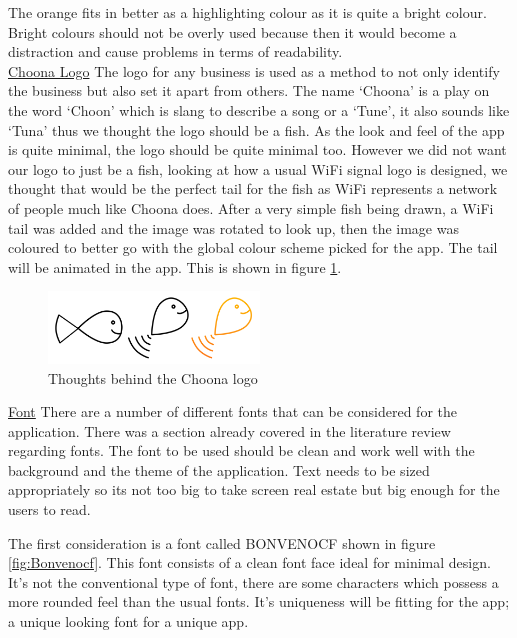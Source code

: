 The orange fits in better as a highlighting colour as it is quite a bright colour. Bright colours should not be overly used because then it would become a distraction and cause problems in terms of readability.  \\

\noindent\underline{Choona Logo}\newline
The logo for any business is used as a method to not only identify the business but also set it apart from others. The name `Choona' is a play on the word `Choon' which is slang to describe a song or a `Tune', it also sounds like `Tuna' thus we thought the logo should be a fish. As the look and feel of the app is quite minimal, the logo should be quite minimal too. However we did not want our logo to just be a fish, looking at how a usual WiFi signal logo is designed, we thought that would be the perfect tail for the fish as WiFi represents a network of people much like Choona does. After a very simple fish being drawn, a WiFi tail was added and the image was rotated to look up, then the image was coloured to better go with the global colour scheme picked for the app. The tail will be animated in the app. This is shown in figure \ref{fig:logo}.

\begin{figure}[h!]
\centering
\includegraphics[width=0.5\textwidth]{./img/logothinking.png}
\caption{Thoughts behind the Choona logo}
\label{fig:logo}
\end{figure}


\noindent\underline{Font}\newline
There are a number of different fonts that can be considered for the application. There was a section already covered in the literature review regarding fonts. The font to be used should be clean and work well with the background and the theme of the application. Text needs to be sized appropriately so its not too big to take screen real estate but big enough for the users to read.

The first consideration is a font called BONVENOCF shown in figure \ref{fig:Bonvenocf}. This font consists of a clean font face ideal for minimal design. It's not the conventional type of font, there are some characters which possess a more rounded feel than the usual fonts. It's uniqueness will be fitting for the app; a unique looking font for a unique app. 

